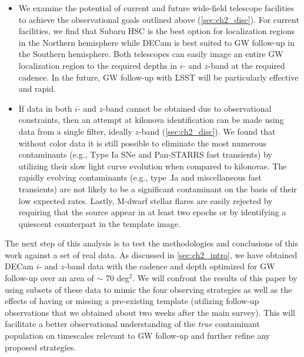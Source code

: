 \begin{itemize}
\item We examine the potential of current and future wide-field telescope facilities to achieve the observational goals outlined above (\autoref{sec:ch2_disc}). For current facilities, we find that Subaru HSC is the best option for localization regions in the Northern hemisphere while DECam is best suited to GW follow-up in the Southern hemisphere. Both telescopes can easily image an entire GW localization region to the required depths in $i$- and $z$-band at the required cadence. In the future, GW follow-up with LSST will be particularly effective and rapid.
\item  If data in both $i$- and $z$-band cannot be obtained due to observational constraints, then an attempt at kilonova identification can be made using data from a single filter, ideally $z$-band (\autoref{sec:ch2_disc}). We found that without color data it is still possible to eliminate the most numerous contaminants (e.g., Type Ia SNe and Pan-STARRS fast transients) by utilizing their slow light curve evolution when compared to kilonovae. The rapidly evolving contaminants (e.g., type .Ia and miscellaneous fast transients) are not likely to be a significant contaminant on the basis of their low expected rates. Lastly, M-dwarf stellar flares are easily rejected by requiring that the source appear in at least two epochs or by identifying a quiescent counterpart in the template image.
\end{itemize}

The next step of this analysis is to test the methodologies and conclusions of this work against a set of real data. As discussed in \autoref{sec:ch2_intro}, we have obtained DECam $i$- and $z$-band data with the cadence and depth optimized for GW follow-up over an area of $\sim$ 70 deg$^2$. We will confront the results of this paper by using subsets of these data to mimic the four observing strategies as well as the effects of having or missing a pre-existing template (utilizing follow-up observations that we obtained about two weeks after the main survey). This will facilitate a better observational understanding of the {\em true} contaminant population on timescales relevant to GW follow-up and further refine any proposed strategies.


